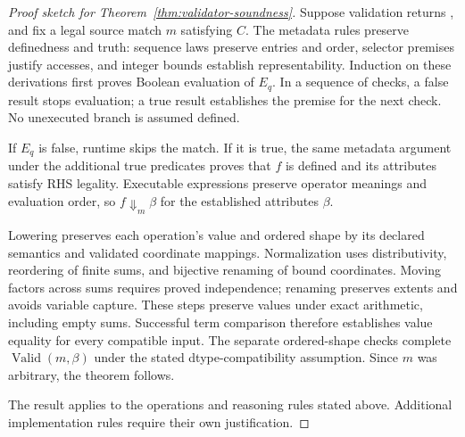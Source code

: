 \begin{proof}[Proof sketch for Theorem~\ref{thm:validator-soundness}]
Suppose validation returns , and fix a legal source match
$m$ satisfying $C$. The metadata rules preserve definedness and truth:
sequence laws preserve entries and order, selector premises justify
accesses, and integer bounds establish representability. Induction on
these derivations first proves Boolean evaluation of $E_q$. In a sequence
of checks, a false result stops evaluation; a true result establishes the
premise for the next check. No unexecuted branch is assumed defined.

If $E_q$ is false, runtime skips the match. If it is true, the same metadata
argument under the additional true predicates proves that $f$ is defined
and its attributes satisfy RHS legality. Executable expressions preserve
operator meanings and evaluation order, so $f\Downarrow_m\beta$ for the
established attributes $\beta$.

Lowering preserves each operation's value and ordered shape by its
declared semantics and validated coordinate mappings. Normalization uses
distributivity, reordering of finite sums, and bijective renaming of bound
coordinates. Moving factors across sums requires proved independence;
renaming preserves extents and avoids variable capture. These steps
preserve values under exact arithmetic, including empty sums. Successful
term comparison therefore establishes value equality for every compatible
input. The separate ordered-shape checks complete
$\operatorname{Valid}(m,\beta)$ under the stated dtype-compatibility
assumption. Since $m$ was arbitrary, the theorem follows.

The result applies to the operations and reasoning rules stated above.
Additional implementation rules require their own justification.
\end{proof}
